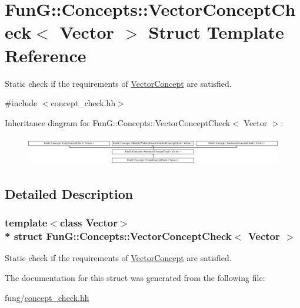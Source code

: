 \hypertarget{structFunG_1_1Concepts_1_1VectorConceptCheck}{}\section{FunG\+:\+:Concepts\+:\+:Vector\+Concept\+Check$<$ Vector $>$ Struct Template Reference}
\label{structFunG_1_1Concepts_1_1VectorConceptCheck}


Static check if the requirements of \hyperlink{structFunG_1_1Concepts_1_1VectorConcept}{Vector\+Concept} are satisfied.  




{\ttfamily \#include $<$concept\+\_\+check.\+hh$>$}

Inheritance diagram for FunG\+:\+:Concepts\+:\+:Vector\+Concept\+Check$<$ Vector $>$\+:\begin{figure}[H]
\begin{center}
\leavevmode
\includegraphics[height=1.287356cm]{structFunG_1_1Concepts_1_1VectorConceptCheck}
\end{center}
\end{figure}


\subsection{Detailed Description}
\subsubsection*{template$<$class Vector$>$\\*
struct Fun\+G\+::\+Concepts\+::\+Vector\+Concept\+Check$<$ Vector $>$}

Static check if the requirements of \hyperlink{structFunG_1_1Concepts_1_1VectorConcept}{Vector\+Concept} are satisfied. 

The documentation for this struct was generated from the following file\+:\begin{DoxyCompactItemize}
\item 
fung/\hyperlink{concept__check_8hh}{concept\+\_\+check.\+hh}\end{DoxyCompactItemize}
